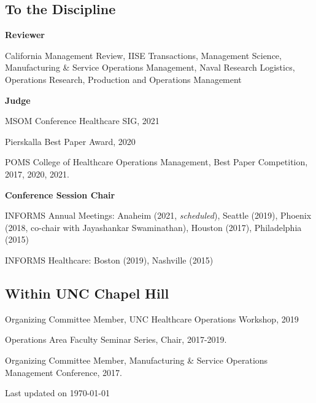 \documentclass[11pt,a4paper]{article}
\newcommand{\updateinfo}[1][\today]{\par\vfill\hfill{\scriptsize\color{gray}Last updated on #1}}
\renewenvironment{itemize}{
	\begin{list}{}{
			\setlength{\leftmargin}{1.5em}
		}
	}{
\end{list}
}
\begin{document}
	\subsection*{To the Discipline}
	\begin{itemize}
		\item \textbf{Reviewer}
		\begin{itemize}

			\item California Management Review, IISE Transactions,  Management Science, Manufacturing \& Service Operations Management, Naval Research Logistics, Operations Research, Production and Operations Management %


		\end{itemize}
		\item \textbf{Judge}
		\begin{itemize}
			\item MSOM Conference Healthcare SIG, 2021
			\item Pierskalla Best Paper Award, 2020
			\item POMS College of Healthcare Operations Management, Best Paper Competition, 2017, 2020, 2021.
		\end{itemize}
		\item \textbf{Conference Session Chair}
		\begin{itemize}
			\item INFORMS Annual Meetings: Anaheim (2021, \emph{scheduled}), Seattle (2019), Phoenix (2018, co-chair with Jayashankar  Swaminathan), Houston (2017), Philadelphia (2015)
			\item INFORMS Healthcare: Boston (2019), Nashville (2015)
			\end{itemize}

	\end{itemize}
	\subsection*{Within UNC Chapel Hill}
	\begin{itemize}
		\item Organizing Committee Member, UNC Healthcare Operations Workshop, 2019
		\item Operations Area Faculty Seminar Series, Chair, 2017-2019.
		\item Organizing Committee Member, Manufacturing \& Service Operations Management Conference, 2017.
	\end{itemize}
	\updateinfo[\today]
\end{document}
